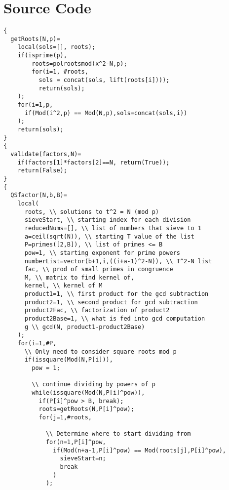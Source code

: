 \documentclass[titlepage]{article}
\begin{document}
	\section{Source Code}
\begin{verbatim}
{
  getRoots(N,p)=
    local(sols=[], roots);
    if(isprime(p),
        roots=polrootsmod(x^2-N,p);
        for(i=1, #roots,
          sols = concat(sols, lift(roots[i])));
	      return(sols);
    );
    for(i=1,p,
      if(Mod(i^2,p) == Mod(N,p),sols=concat(sols,i))
    );
    return(sols);
}
{
  validate(factors,N)=
    if(factors[1]*factors[2]==N, return(True));
    return(False);
}
{
  QSfactor(N,b,B)=
    local(
      roots, \\ solutions to t^2 = N (mod p)
      sieveStart, \\ starting index for each division
      reducedNums=[], \\ list of numbers that sieve to 1
      a=ceil(sqrt(N)), \\ starting T value of the list
      P=primes([2,B]), \\ list of primes <= B
      pow=1, \\ starting exponent for prime powers
      numberList=vector(b+1,i,((i+a-1)^2-N)), \\ T^2-N list
      fac, \\ prod of small primes in congruence
      M, \\ matrix to find kernel of,
      kernel, \\ kernel of M
      product1=1, \\ first product for the gcd subtraction
      product2=1, \\ second product for gcd subtraction
      product2Fac, \\ factorization of product2
      product2Base=1, \\ what is fed into gcd computation
      g \\ gcd(N, product1-product2Base)
    );
    for(i=1,#P,
      \\ Only need to consider square roots mod p
      if(issquare(Mod(N,P[i])),
        pow = 1;
      
        \\ continue dividing by powers of p
        while(issquare(Mod(N,P[i]^pow)),
          if(P[i]^pow > B, break);
          roots=getRoots(N,P[i]^pow);
          for(j=1,#roots,
          
            \\ Determine where to start dividing from
            for(n=1,P[i]^pow,
              if(Mod(n+a-1,P[i]^pow) == Mod(roots[j],P[i]^pow),
                sieveStart=n;
                break
              )
            );
          

\end{verbatim}
\end{document}

